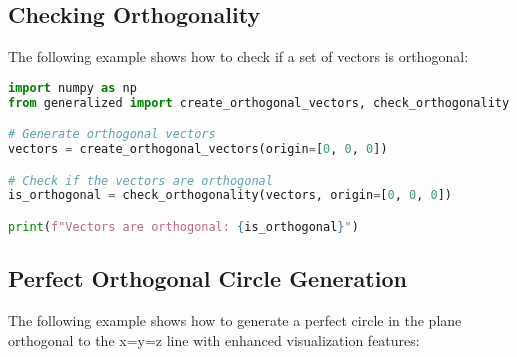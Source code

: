 \subsection{Checking Orthogonality}

The following example shows how to check if a set of vectors is orthogonal:

\begin{lstlisting}[language=Python]
import numpy as np
from generalized import create_orthogonal_vectors, check_orthogonality

# Generate orthogonal vectors
vectors = create_orthogonal_vectors(origin=[0, 0, 0])

# Check if the vectors are orthogonal
is_orthogonal = check_orthogonality(vectors, origin=[0, 0, 0])

print(f"Vectors are orthogonal: {is_orthogonal}")
\end{lstlisting}

\subsection{Perfect Orthogonal Circle Generation}

The following example shows how to generate a perfect circle in the plane orthogonal to the x=y=z line with enhanced visualization features:

